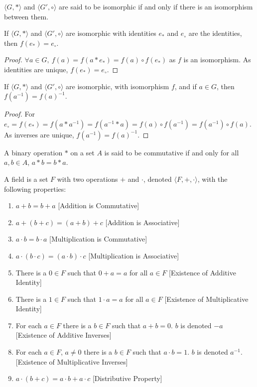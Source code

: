 \documentclass[crop=false,class=article,oneside]{standalone}
\begin{document}
        \begin{definition}
        $\langle G, *\rangle$ and $\langle G', \circ \rangle$ are said to be isomorphic if and only if there is an isomorphism between them.
        \end{definition}
        \begin{theorem}
        If $\langle G, * \rangle$ and $\langle G', \circ \rangle$ are isomorphic with identities $e_*$ and $e_{\circ}$ are the identities, then $f(e_*) = e_{\circ}$.
        \end{theorem}
        \begin{proof}
        $\forall a\in G,\ f(a)=f(a* e_*) = f(a)\circ f(e_*)$ as $f$ is an isomorphism. As identities are unique, $f(e_*) = e_{\circ}$.
        \end{proof}
        \begin{theorem}
        If $\langle G, * \rangle$ and $\langle G', \circ \rangle$ are isomorphic, with isomorphism $f$, and if $a\in G$, then $f(a^{-1}) = f(a)^{-1}$.
        \end{theorem}
        \begin{proof}
        For $e_{\circ}=f(e_*) = f(a*a^{-1}) = f(a^{-1}*a) = f(a)\circ f(a^{-1})=f(a^{-1})\circ f(a)$. As inverses are unique, $f(a^{-1})=f(a)^{-1}$.
        \end{proof}
        \begin{definition}
        A binary operation $*$ on a set $A$ is said to be commutative if and only for all $a,b\in A$, $a*b = b*a$.
        \end{definition}
        \begin{definition}
        A field is a set $F$ with two operations $+$ and $\cdot$, denoted $\langle F, +,\cdot \rangle$, with the following properties:
        \begin{enumerate}
        \item $a+b=b+a$ \hfill [Addition is Commutative]
        \item $a+(b+c)=(a+b)+c$ \hfill [Addition is Associative]
        \item $a\cdot b = b\cdot a$ \hfill [Multiplication is Commutative]
        \item $a\cdot (b\cdot c) = (a\cdot b)\cdot c$ \hfill [Multiplication is Associative]
        \item There is a $0\in F$ such that $0+a=a$ for all $a\in F$ \hfill [Existence of Additive Identity]
        \item There is a $1\in F$ such that $1\cdot a = a$ for all $a\in F$ \hfill [Existence of Multiplicative Identity]
        \item For each $a\in F$ there is a $b\in F$ such that $a+b = 0$. $b$ is denoted $-a$ \hfill [Existence of Additive Inverses]
        \item For each $a\in F$, $a\ne 0$ there is a $b\in F$ such that $a\cdot b = 1$. $b$ is denoted $a^{-1}$. \hfill [Existence of Multiplicative Inverses]
        \item $a\cdot(b+c) = a\cdot b + a\cdot c$ \hfill [Distributive Property]
        \end{enumerate}
        \end{definition}
\end{document}
